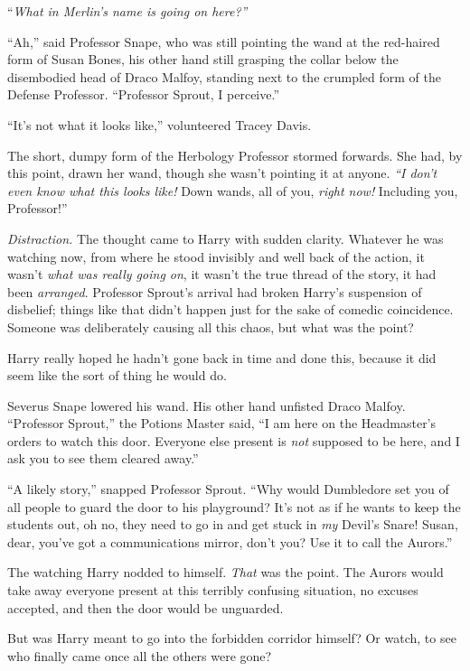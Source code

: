 ``\emph{What in Merlin's name is going on here?''}

``Ah,'' said Professor Snape, who was still pointing the wand at the red-haired form of Susan Bones, his other hand still grasping the collar below the disembodied head of Draco Malfoy, standing next to the crumpled form of the Defense Professor. ``Professor Sprout, I perceive.''

``It's not what it looks like,'' volunteered Tracey Davis.

The short, dumpy form of the Herbology Professor stormed forwards. She had, by this point, drawn her wand, though she wasn't pointing it at anyone. \emph{``I don't even know what this looks like!} Down wands, all of you, \emph{right now!} Including you, Professor!''

\emph{Distraction.} The thought came to Harry with sudden clarity. Whatever he was watching now, from where he stood invisibly and well back of the action, it wasn't \emph{what was really going on}, it wasn't the true thread of the story, it had been \emph{arranged}. Professor Sprout's arrival had broken Harry's suspension of disbelief; things like that didn't happen just for the sake of comedic coincidence. Someone was deliberately causing all this chaos, but what was the point?

Harry really hoped he hadn't gone back in time and done this, because it did seem like the sort of thing he would do.

Severus Snape lowered his wand. His other hand unfisted Draco Malfoy. ``Professor Sprout,'' the Potions Master said, ``I am here on the Headmaster's orders to watch this door. Everyone else present is \emph{not} supposed to be here, and I ask you to see them cleared away.''

``A likely story,'' snapped Professor Sprout. ``Why would Dumbledore set you of all people to guard the door to his playground? It's not as if he wants to keep the students out, oh no, they need to go in and get stuck in \emph{my} Devil's Snare! Susan, dear, you've got a communications mirror, don't you? Use it to call the Aurors.''

The watching Harry nodded to himself. \emph{That} was the point. The Aurors would take away everyone present at this terribly confusing situation, no excuses accepted, and then the door would be unguarded.

But was Harry meant to go into the forbidden corridor himself? Or watch, to see who finally came once all the others were gone?


